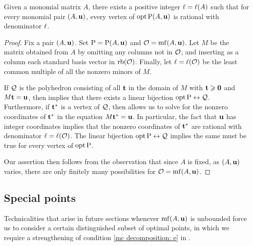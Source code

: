 \documentclass[11pt]{amsart}
\begin{document}
\begin{theorem}  
\label{uniform denominators for vertices:  T}
Given a monomial matrix $A$, there exists a positive integer $\ell = \ell(A)$ such that for every monomial pair $(A, \mathbf{u})$, every vertex of $\operatorname{opt} \mathrm{P}(A, \mathbf{u})$ is rational with denominator $\ell$.
\end{theorem}

\begin{proof}

Fix a pair $(A, \mathbf{u})$. Set $\mathrm{P} = \mathrm{P}(A, \mathbf{u})$ and $\mathcal{O} = \operatorname{mf}(A, \mathbf{u})$.  Let $M$ be the matrix obtained from $A$ by omitting any columns not in $\mathcal{O}$, and inserting as a column each standard basis vector in $\operatorname{rb}(\mathcal{O})$.  Finally, let $\ell = \ell(\mathcal{O})$ be the least common multiple of all the nonzero minors of $M$.

If $\mathcal{Q}$ is the polyhedron consisting of all $\mathbf{t}$ in the domain of $M$ with $\mathbf{t} \geqslant \mathbf{0}$ and $M \mathbf{t} = \mathbf{u}$, then  implies that there exists a linear bijection $\operatorname{opt} \mathrm{P} 
\leftrightarrow \mathcal{Q}$.  Furthermore, if $\mathbf{t}^{\ast}$ is a vertex of $\mathcal{Q}$, then  allows us to solve for the nonzero coordinates of $\mathbf{t}^{\ast}$ in the equation $M \mathbf{t}^{\ast} = \mathbf{u}$.  In particular, the fact that $\mathbf{u}$ has integer coordinates implies that the nonzero coordinates of $\mathbf{t}^{\ast}$ are rational with denominator $\ell = \ell(\mathcal{O})$.  The linear bijection $\operatorname{opt} \mathrm{P} \leftrightarrow \mathcal{Q}$ implies the same must be true for every vertex of $\operatorname{opt} \mathrm{P}$.

Our assertion then follows from the observation that since $A$ is fixed, as $(A, \mathbf{u})$ varies, there are only finitely many possibilities for $\mathcal{O} = \operatorname{mf}(A, \mathbf{u})$.
\end{proof}


\subsection{Special points}


Technicalities that arise in future sections whenever $\operatorname{mf}(A, \mathbf{u})$ is unbounded force us to consider a certain distinguished subset of optimal points, in which we require a strengthening of condition \eqref{mc decomposition: e} in .
\end{document}
